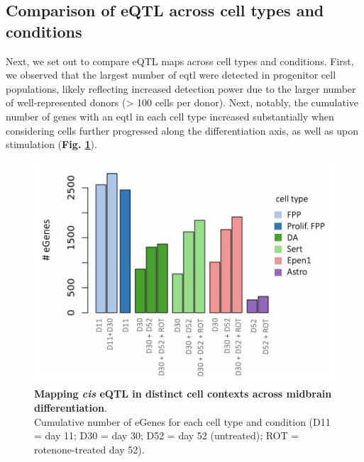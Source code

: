 

\clearpage

\subsection{Comparison of eQTL across cell types and conditions}

Next, we set out to compare eQTL maps across cell types and conditions.
First, we observed that the largest number of \gls{eqtl} were detected in progenitor cell populations, likely reflecting increased detection power due to the larger number of well-represented donors (> 100 cells per donor). 
Next, notably, the cumulative number of genes with an \gls{eqtl} in each cell type increased substantially when considering cells further progressed along the differentiation axis, as well as upon stimulation (\textbf{Fig. \ref{fig:neuroseq_eqtl}}). 


\begin{figure}[h]
\centering
\includegraphics[width=14cm]{Chapter5/Fig/neuroseq_eqtl_cumulative.png}
\caption[Mapping eQTL across neuronal cell types]{\textbf{Mapping \textit{cis} eQTL in distinct cell contexts across midbrain differentiation}.\\
Cumulative number of eGenes for each cell type and condition (D11 = day 11; D30 = day 30; D52 = day 52 (untreated); ROT = rotenone-treated day 52).}
\label{fig:neuroseq_eqtl}
\end{figure}

